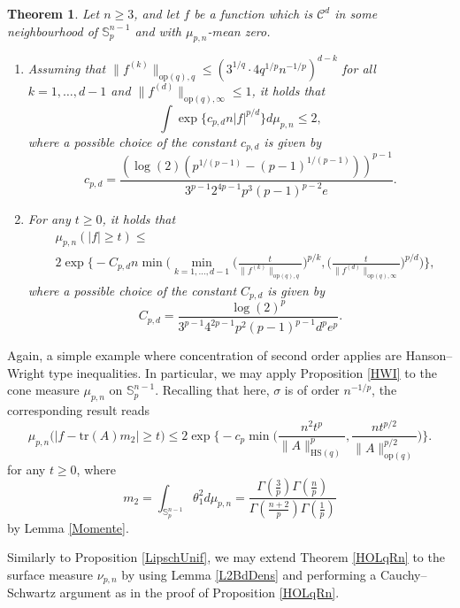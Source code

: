 \documentclass[a4paper,12pt]{amsart}
\numberwithin{equation}{section}
\newtheorem{satz}{Theorem}[section]
\theoremstyle{remark}
\def\S{{\mathbb S}}
\begin{document}
\begin{satz}\label{HOSph}
Let $n \ge 3$, and let $f$ be a function which is $\mathcal{C}^d$ in some neighbourhood of $\S_p^{n-1}$ and with $\mu_{p,n}$-mean zero.
    \begin{enumerate}
        \item Assuming that $\lVert f^{(k)} \rVert_{\mathrm{op}(q),q} \le (3^{1/q} \cdot 4 q^{1/p} n^{-1/p})^{d-k}$ for all $k=1,\ldots,d-1$ and $\lVert f^{(d)} \rVert_{\mathrm{op}(q),\infty} \le 1$, it holds that
        \[
        \int \exp\Big\{c_{p,d}n |f|^{p/d} \Big\} d\mu_{p,n} \le 2,
        \]
        where a possible choice of the constant $c_{p,d}$ is given by
        \[
        c_{p,d} = \frac{(\log(2)(p^{1/(p-1)}-(p-1)^{1/(p-1)}))^{p-1}}{3^{p-1}2^{4p-1}p^3(p-1)^{p-2}e}.
        \]
        \item For any $t\ge 0$, it holds that
        \begin{align*}
        &\mu_{p,n}(|f| \ge t)\le\\
        &2 \exp\Big\{- C_{p,d}n \min\Big(\min_{k=1, \ldots,d-1} \Big(\frac{t}{\lVert f^{(k)} \rVert_{\mathrm{op}(q),q}}\Big)^{p/k}, \Big(\frac{t}{\lVert f^{(d)} \rVert_{\mathrm{op}(q),\infty}}\Big)^{p/d}\Big)\Big\},
        \end{align*}
    where a possible choice of the constant $C_{p,d}$ is given by
    \[
    C_{p,d} = \frac{\log(2)^p}{3^{p-1}4^{2p-1}p^2(p-1)^{p-1}d^pe^p}.
    \]
    \end{enumerate}
\end{satz}

Again, a simple example where concentration of second order applies are Hanson--Wright type inequalities. In particular, we may apply Proposition \ref{HWI} to the cone measure $\mu_{p,n}$ on $\S_p^{n-1}$. Recalling that here, $\sigma$ is of order $n^{-1/p}$, the corresponding result reads
\[
\mu_{p,n}\Big(\Big|f - \mathrm{tr}(A)m_2\Big| \ge t\Big) \le 2\exp\Big\{-c_p\min \Big(\frac{n^2t^p}{\lVert A \rVert_{\mathrm{HS}(q)}^p}, \frac{nt^{p/2}}{\lVert A \rVert_{\mathrm{op}(q)}^{p/2}}\Big)\Big\}.
\]
for any $t \ge 0$, where
\[
m_2 = \int_{\S_p^{n-1}} \theta_1^2 d\mu_{p,n} = \frac{ \Gamma(\frac{3}{p})\Gamma(\frac{n}{p})} {\Gamma(\frac{n+2}{p}) \Gamma(\frac 1 p)}
\]
by Lemma \ref{Momente}.

Similarly to Proposition \ref{LipschUnif}, we may extend Theorem \ref{HOLqRn} to the surface measure $\nu_{p,n}$ by using Lemma \ref{L2BdDens} and performing a Cauchy--Schwartz argument as in the proof of Proposition \ref{HOLqRn}.
\end{document}

